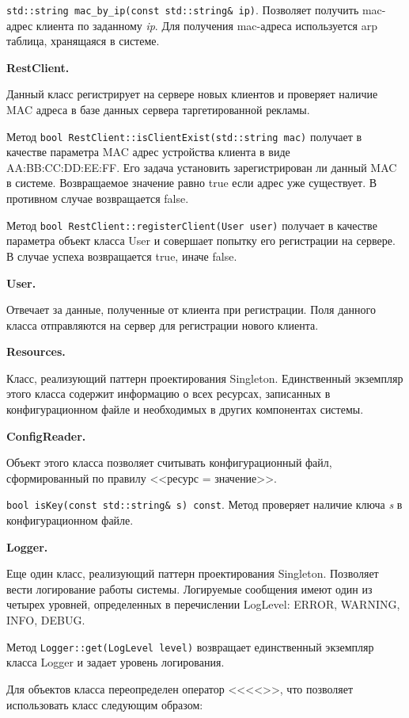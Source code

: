 \texttt{std::string mac\_by\_ip(const std::string\& ip)}. Позволяет получить mac-адрес клиента по заданному \textit{ip}. Для получения mac-адреса используется arp таблица, хранящаяся в системе.

\textbf{RestClient.}

Данный класс регистрирует на сервере новых клиентов и проверяет наличие MAC адреса в базе данных сервера таргетированной рекламы.

Метод \texttt{bool RestClient::isClientExist(std::string mac)} получает в качестве параметра MAC адрес устройства клиента в виде AA:BB:CC:DD:EE:FF. Его задача установить зарегистрирован ли данный MAC в системе. Возвращаемое значение равно true если адрес уже существует. В противном случае возвращается false.

Метод \texttt{bool RestClient::registerClient(User user)} получает в качестве параметра объект класса User и совершает попытку его регистрации на сервере. В случае успеха возвращается true, иначе false.

\textbf{User.}

Отвечает за данные, полученные от клиента при регистрации. Поля данного класса отправляются на сервер для регистрации нового клиента.

\textbf{Resources.}

Класс, реализующий паттерн проектирования Singleton. Единственный экземпляр этого класса содержит информацию о всех ресурсах, записанных в конфигурационном файле и необходимых в других компонентах системы.

\textbf{ConfigReader.}

Объект этого класса позволяет считывать конфигурационный файл, сформированный по правилу <<ресурс = значение>>.

\texttt{bool isKey(const std::string\& s) const}. Метод проверяет наличие ключа \textit{s} в конфигурационном файле.

\textbf{Logger.}

Еще один класс, реализующий паттерн проектирования Singleton. Позволяет вести логирование работы системы. Логируемые сообщения имеют один из четырех уровней, определенных в перечислении LogLevel: ERROR, WARNING, INFO, DEBUG.

Метод \texttt{Logger::get(LogLevel level)} возвращает единственный экземпляр класса Logger и задает уровень логирования.

Для объектов класса переопределен оператор <<<<>>, что позволяет использовать класс следующим образом:

